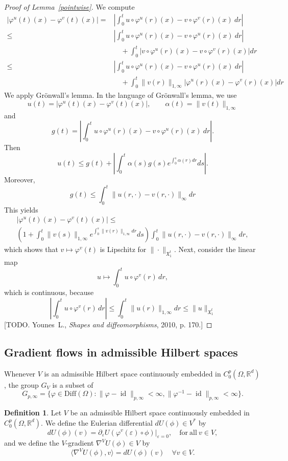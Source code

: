 \documentclass[a5paper,11pt,twoside]{article}
\theoremstyle{plain}
\newcommand{\R}{\ensuremath{\mathbb{R}}}
\newcommand{\X}{\ensuremath{\mathfrak{X}}}
\newcommand{\Diff}{\ensuremath{\mathrm{Diff}}}
\newcommand{\id}{\operatorname{id}}
\theoremstyle{definition}
\newtheorem{defin}[teo]{Definition}
\begin{document}
\begin{proof}[Proof of Lemma~\ref{pointwise}]
We compute
\begin{align*}
\left|\varphi^u(t)(x)-\varphi^v(t)(x)\right| =& \left|\int_0^t u\circ \varphi^u(r)(x)-v\circ \varphi^v(r)(x)\ dr\right|\\
\leq & \left|\int_0^t u\circ \varphi^u(r)(x)-v\circ \varphi^u(r)(x)\ dr\right|\\
&\quad +\int_0^t \left|v\circ \varphi^u(r)(x)-v\circ \varphi^v(r)(x)\right| dr\\
\leq & \left|\int_0^t u\circ \varphi^u(r)(x)-v\circ \varphi^u(r)(x)\ dr\right|\\
&\quad +\int_0^t\|v(r)\|_{1,\infty} \left|\varphi^u(r)(x)-\varphi^v(r)(x)\right| dr
\end{align*}
We apply Grönwall's lemma. In the language of Grönwall's lemma, we use
\[
u(t)=\left|\varphi^u(t)(x)-\varphi^v(t)(x)\right|,\qquad \alpha(t)=\|v(t)\|_{1,\infty}
\]
and
\[
g(t)=\left|\int_0^t u\circ \varphi^u(r)(x)-v\circ \varphi^u(r)(x)\ dr\right|.
\]
Then
\[
u(t)\leq g(t)+\left|\int_0^t \alpha(s) g(s) e^{\int_0^s\alpha(r)dr}ds\right|.
\]
Moreover,
\[
g(t)\leq \int_0^t\|u(r,\cdot)-v(r,\cdot)\|_\infty dr
\]
This yields
\begin{multline*}
\left|\varphi^u(t)(x)-\varphi^v(t)(x)\right|\leq\\
\left(1+\int_0^t \|v(s)\|_{1,\infty}e^{\int_0^s\|v(r)\|_{1,\infty}dr}ds\right)\int_0^t\|u(r,\cdot)-v(r,\cdot)\|_\infty dr,
\end{multline*}
which shows that $v\mapsto\varphi^v(t)$ is Lipschitz for $\|\cdot\|_{\X_1^t}$. Next, consider the linear map
\[
u\mapsto \int_0^t u\circ \varphi^v(r)\,dr,
\]
which is continuous, because
\[
\left|\int_0^t u\circ \varphi^v(r)\,dr\right|\leq \int_0^t\|u(r)\|_{1,\infty}dr\leq \|u\|_{\X_1^t}
\]
[TODO. Younes~L., \textit{Shapes and diffeomorphisms}, 2010, p. 170.]
\end{proof}


\subsection{Gradient flows in admissible Hilbert spaces}
Whenever $V$ is an admissible Hilbert space continuously embedded in $C_0^p(\Omega,\R^d)$, the group $G_V$ is a subset of 
\[
G_{p,\infty}=\{\varphi\in\Diff(\Omega): \|\varphi-\id\|_{p,\infty}<\infty, \|\varphi^{-1}-\id\|_{p,\infty}<\infty\}.
\]

\begin{defin}
	Let $V$ be an admissible Hilbert space continuously embedded in $C_0^p(\Omega,\R^d)$. We define the Eulerian differential $dU(\phi)\in V^*$ by
	\[
	dU(\phi)(v)=\partial_\varepsilon U(\varphi^v(\varepsilon)\circ \phi)|_{\varepsilon=0},\quad\mathrm{for\ all\ } v\in V,
	\]
	and we define the $V$-gradient $\nabla^VU(\phi)\in V$ by
	\[
	\langle \nabla^VU(\phi),v\rangle =dU(\phi)(v)\quad\forall v\in V.
	\]
\end{defin}
\end{document}
